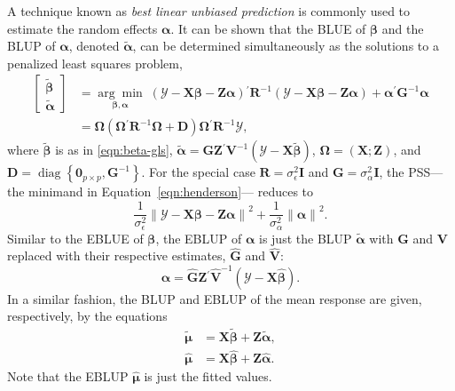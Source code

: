 \documentclass[cmfont,usenames,dvipsnames,leqno]{afit-etd}\usepackage[]{graphicx}\usepackage[]{color}
\newcommand{\norm}[1]{\left\|#1\right\|}
\newcommand{\trans}{\ensuremath{^\prime}}
\newcommand{\bc}[1]{\ensuremath{\bm{\mathcal{#1}}}}
\newcommand{\wh}[1]{\ensuremath{\widehat{#1}}}
\newcommand{\wt}[1]{\ensuremath{\widetilde{#1}}}
\newcommand{\argmin}[1]{\underset{#1}{\operatorname{arg}\!\operatorname{min}}\;}
\newcommand{\diag}{\operatorname{diag}}
\newcommand{\X}{\ensuremath{\bm{X}}}
\newcommand{\Z}{\ensuremath{\bm{Z}}}
\begin{document}
A technique known as \textit{best linear unbiased prediction} is commonly used to estimate the random effects $\bm{\alpha}$. It can be shown \citep{henderson_sire_1973} that the \ac{BLUE} of $\bm{\beta}$ and the \ac{BLUP} of $\bm{\alpha}$, denoted $\wt{\bm{\alpha}}$, can be determined simultaneously as the solutions to a penalized least squares problem,
\begin{align}
  \begin{bmatrix} 
    \wt{\bm{\beta}} \\ \wt{\bm{\alpha}} 
  \end{bmatrix} &= \argmin{\bm{\beta}, \bm{\alpha}} (\bc{Y} - \X\bm{\beta} - \Z\bm{\alpha})\trans\bm{R}^{-1}(\bc{Y} - \X\bm{\beta} - \Z\bm{\alpha}) + \bm{\alpha}\trans\bm{G}^{-1}\bm{\alpha} \label{eqn:henderson} \\
  &= \bm{\Omega}(\bm{\Omega}\trans\bm{R}^{-1}\bm{\Omega} + \bm{D})\bm{\Omega}\trans\bm{R}^{-1}\bc{Y} \nonumber,
\end{align}
where $\wt{\bm{\beta}}$ is as in \eqref{eqn:beta-gls}, $\wt{\bm{\alpha}} = \bm{G}\Z\trans\bm{V}^{-1}\left(\bc{Y} - \X\wt{\bm{\beta}}\right)$, $\bm{\Omega} = \left(\X; \Z\right)$, and $\bm{D} = \diag\left\{\bm{0}_{p \times p}, \bm{G}^{-1}\right\}$.
For the special case $\bm{R} = \sigma_\epsilon^2\bm{I}$ and $\bm{G} = \sigma_\alpha^2\bm{I}$, the \ac{PSS}---the minimand in Equation~\eqref{eqn:henderson}--- reduces to
\begin{equation}
\label{eqn:lmm-pss}
  \frac{1}{\sigma_\epsilon^2}\norm{\bc{Y} - \X\bm{\beta} - \Z\bm{\alpha}}^2 +\frac{1}{\sigma_\alpha^2}\norm{\bm{\alpha}}^2.
\end{equation}
Similar to the \ac{EBLUE} of $\bm{\beta}$, the \ac{EBLUP} of $\bm{\alpha}$ is just the \ac{BLUP} $\wt{\bm{\alpha}}$ with $\bm{G}$ and $\bm{V}$ replaced with their respective estimates, $\widehat{\bm{G}}$ and $\widehat{\bm{V}}$:
\begin{equation}
\label{eqn:alpha-eblup}
  \wh{\bm{\alpha}} = \widehat{\bm{G}}\Z\trans\widehat{\bm{V}}^{-1}\left(\bc{Y} - \X\wh{\bm{\beta}}\right).
\end{equation} 
In a similar fashion, the \ac{BLUP} and \ac{EBLUP} of the mean response are given, respectively, by the equations
\begin{align}
  \widetilde{\bm{\mu}} &= \X\wt{\bm{\beta}} + \Z\wt{\bm{\alpha}}, \label{eqn:mu-blup} \\
  \wh{\bm{\mu}} &= \X\wh{\bm{\beta}} + \Z\wh{\bm{\alpha}}. \label{eqn:mu-eblup}
\end{align}
Note that the \ac{EBLUP} $\wh{\bm{\mu}}$ is just the fitted values.
\end{document}

